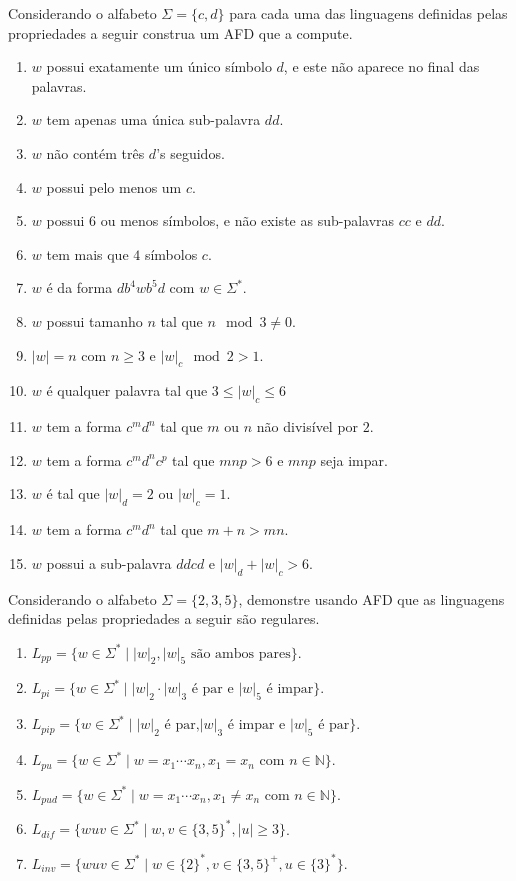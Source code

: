 \begin{problemset}
	\item Considerando o alfabeto $\Sigma = \{c, d\}$ para cada uma das linguagens definidas pelas propriedades a seguir construa um AFD que a compute.
	\begin{enumerate}
		\item $w$ possui exatamente um único símbolo $d$, e este não aparece no final das palavras.
		\item $w$ tem apenas uma única sub-palavra $dd$.
		\item $w$ não contém três $d$'s seguidos.
		\item $w$ possui pelo menos um $c$.
		\item $w$ possui 6 ou menos símbolos, e não existe as sub-palavras $cc$ e $dd$.
		\item $w$ tem mais que $4$ símbolos $c$.
		\item $w$ é da forma $db^4wb^5d$ com $w \in \Sigma^*$.
		\item $w$ possui tamanho $n$ tal que $n \mod 3 \neq 0$.
		\item $|w| = n$ com $n \geq 3$ e $|w|_c \mod 2 > 1$.
		\item $w$ é qualquer palavra tal que $3 \leq |w|_c \leq 6$
		\item $w$ tem a forma $c^md^n$ tal que $m$ ou $n$ não divisível por $2$.
		\item $w$ tem a forma $c^md^nc^p$ tal que $mnp > 6$ e $mnp$ seja impar.
		\item $w$ é tal que $|w|_d = 2$ ou $|w|_c = 1$.
		\item $w$ tem a forma $c^md^n$ tal que $m+n > mn$.
		\item $w$ possui a sub-palavra  $ddcd$ e $|w|_d + |w|_c > 6$.
	\end{enumerate}
	\item Considerando o alfabeto $\Sigma = \{2, 3, 5\}$, demonstre usando AFD que as linguagens definidas pelas propriedades a seguir são regulares.
	\begin{enumerate}
		\item $L_{pp} = \{w \in \Sigma^* \mid |w|_2, |w|_5 \text{ são ambos pares}\}$.
		\item $L_{pi} = \{w \in \Sigma^* \mid |w|_2 \cdot |w|_3 \text{ é par e } |w|_5 \text{ é impar}\}$.
		\item $L_{pip} = \{w \in \Sigma^* \mid |w|_2 \text{ é par,} |w|_3 \text{ é impar e } |w|_5 \text{ é par}\}$.
		\item $L_{pu} = \{w \in \Sigma^* \mid w = x_1\cdots x_n, x_1 = x_n \text{ com } n \in \mathbb{N}\}$.
		\item $L_{pud} = \{w \in \Sigma^* \mid w = x_1\cdots x_n, x_1 \neq x_n \text{ com } n \in \mathbb{N}\}$.
		\item $L_{dif} = \{wuv \in \Sigma^* \mid w,v \in \{3,5\}^*, |u| \geq 3\}$.
		\item $L_{inv} = \{wuv \in \Sigma^* \mid w \in \{2\}^*,v \in \{3,5\}^+, u \in \{3\}^*\}$.
	\end{enumerate}


\end{problemset}
